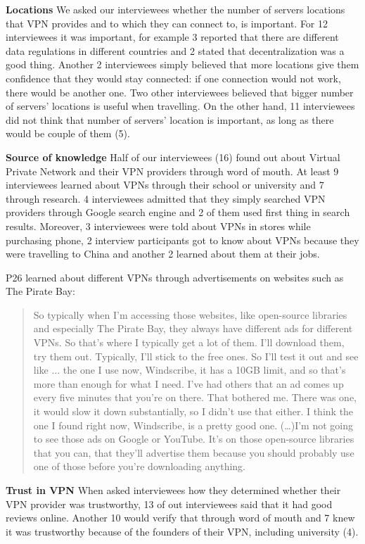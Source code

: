 \textbf{Locations} We asked our interviewees whether the number of servers locations that VPN provides and to which they can connect to, is important. For 12 interviewees it was important, for example 3 reported that there are different data regulations in different countries and 2 stated that decentralization was a good thing. Another 2 interviewees simply believed that more locations give them confidence that they would stay connected: if one connection would not work, there would be another one. Two other interviewees believed that bigger number of servers’ locations is useful when travelling.  On the other hand, 11 interviewees did not think that number of servers’ location is important, as long as there would be couple of them (5).  

\textbf{Source of knowledge}
Half of our interviewees (16) found out about Virtual Private Network and their VPN providers through word of mouth. At least 9 interviewees learned about VPNs through their school or university and 7 through research. 4 interviewees admitted that they simply searched VPN providers through Google search engine and 2 of them used first thing in search results. Moreover, 3 interviewees were told about VPNs in stores while purchasing phone, 2 interview participants got to know about VPNs because they were travelling to China and another 2 learned about them at their jobs.

P26 learned about different VPNs through advertisements on websites such as The Pirate Bay:
\begin{quote}So typically when I'm accessing those websites, like open-source libraries and especially The Pirate Bay, they always have different ads for different VPNs. So that's where I typically get a lot of them. I'll download them, try them out. Typically, I'll stick to the free ones. So I'll test it out and see like ... the one I use now, Windscribe, it has a 10GB limit, and so that's more than enough for what I need. I've had others that an ad comes up every five minutes that you're on there. That bothered me. There was one, it would slow it down substantially, so I didn't use that either. I think the one I found right now, Windscribe, is a pretty good one.
(\dots)I'm not going to see those ads on Google or YouTube. It's on those open-source libraries that you can, that they'll advertise them because you should probably use one of those before you're downloading anything.\end{quote}

\textbf{Trust in VPN}
When asked interviewees how they determined whether their VPN provider was trustworthy, 13 of out interviewees said that it had good reviews online. Another 10 would verify that through word of mouth and 7 knew it was trustworthy because of the founders of their VPN, including university (4). 


